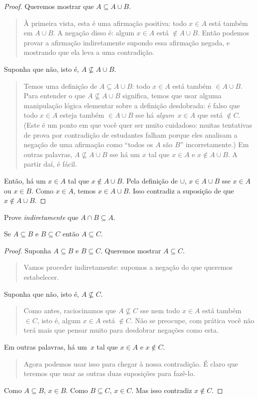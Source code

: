 \documentclass[../../../include/open-logic-section]{subfiles}
\begin{document}
\begin{proof}
  Queremos mostrar que $A \subseteq A \cup B$.
  \begin{quote}
    À primeira vista, esta é uma afirmação positiva: todo $x \in A$ está
    também em $A \cup B$.  A negação disso é: algum $x \in A$ está
    $\notin A \cup B$. Então podemos provar a afirmação indiretamente
    supondo essa afirmação negada, e mostrando que ela leva a uma
    contradição.
    \end{quote}
  Suponha que não, isto é, $A \nsubseteq A \cup B$.
  \begin{quote}
    Temos uma definição de $A \subseteq A \cup B$: todo $x \in A$ está
    também $\in A \cup B$.  Para entender o que $A \nsubseteq A \cup B$
    significa, temos que usar alguma manipulação lógica elementar sobre a
    definição desdobrada: é falso que todo $x \in A$ esteja também $\in
    A \cup B$ sse há \emph{algum}~$x \in A$ que está $\notin C$.
    (Este é um ponto em que você quer ser muito cuidadoso: muitas tentativas de
    prova por contradição de estudantes falham porque eles analisam a
    negação de uma afirmação como ``todos os $A$ são $B$'' incorretamente.) Em
    outras palavras, $A \nsubseteq A \cup B$ sse há um $x$ tal que
    $x \in A$ e $x \notin A \cup B$. A partir daí, é fácil.
  \end{quote}
  Então, há um $x \in A$ tal que $x \notin A \cup B$.  Pela
  definição de $\cup$, $x \in A \cup B$ sse $x \in A$ ou $x \in
  B$. Como $x \in A$, temos $x \in A \cup B$. Isso contradiz a
  suposição de que $x \notin A \cup B$. 
\end{proof}

\begin{prob}
Prove \emph{indiretamente} que $A \cap B \subseteq A$.
\end{prob}

\begin{prop}
Se $A \subseteq B$ e $B \subseteq C$ então $A \subseteq C$.
\end{prop}

\begin{proof}
  Suponha $A \subseteq B$ e $B \subseteq C$. Queremos mostrar $A
  \subseteq C$.
  \begin{quote}
    Vamos proceder indiretamente: supomos a negação do que queremos
    estabelecer.
  \end{quote}
  Suponha que não, isto é, $A \nsubseteq C$.
  \begin{quote}
    Como antes, raciocinamos que $A \nsubseteq C$ sse nem todo $x \in A$
    está também $\in C$, isto é, algum $x \in A$ está $\notin C$.  Não se preocupe,
    com prática você não terá mais que pensar muito para desdobrar
    negações como esta.
  \end{quote}
  Em outras palavras, há um~$x$ tal que $x \in A$ e $x \notin C$.
  \begin{quote}
    Agora podemos usar isso para chegar à nossa contradição. É claro que
    teremos que usar as outras duas suposições para fazê-lo.
  \end{quote}
  Como $A \subseteq B$, $x \in B$. Como $B \subseteq C$, $x \in
  C$. Mas isso contradiz $x \notin C$.
\end{proof}
\end{document}

